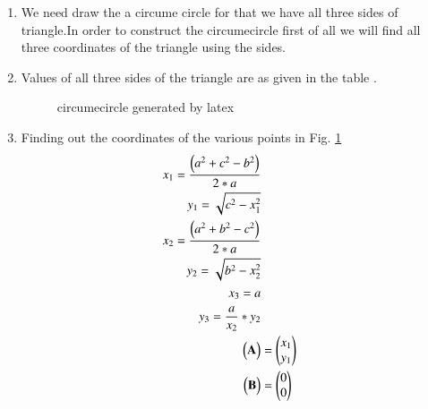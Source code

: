 \begin{enumerate}[label=\thesection.\arabic*.,ref=\thesection.\theenumi]
\item We need draw the a circume circle for that we have all three sides of triangle.In order to construct the circumecircle first of all we will find all three coordinates of the triangle using the sides.

\item Values of all three sides of the triangle are as given in the table .


\begin{figure}[!ht]
\centering
\resizebox{\columnwidth}{!}{}
\caption{ circumecircle generated by latex}
\label{fig:C_circle}	
\end{figure}
%
%
%


%
\begin{table}[ht!]
\centering

\caption{To construct circumecircle}
\label{table:table1}	
\end{table}

\item Finding out  the coordinates of the various points in Fig. \ref{fig:C_circle}
\\
% 
\begin{align}
x_1 = \frac{\left(a^2 + c^2 - b^2\right)}{2*a}
\\
y_1 = \sqrt{c^2 - x_1^2}
\\
x_2 = \frac{\left(a^2 + b^2 - c^2\right)}{2*a}
\\
y_2 = \sqrt{b^2 - x_2^2}
\\
x_3 = a
\\
y_3 = \frac{a}{x_2}*{y_2}
\\
\begin{pmatrix}\mathbf{A}\end{pmatrix} &= \begin{pmatrix}x_1 \\ y_1\end{pmatrix}
\\
\begin{pmatrix}\mathbf{B}\end{pmatrix} &= \begin{pmatrix}0 \\ 0\end{pmatrix}
\end{align}


\end{enumerate}
